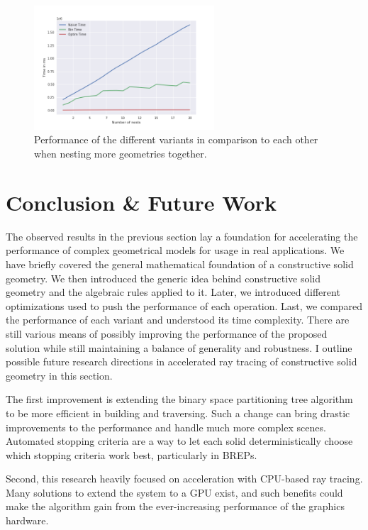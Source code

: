\documentclass[a4paper,11pt,oneside]{article}
\begin{document}
\begin{figure}[H]
	\centering
	\includegraphics[width=0.6\textwidth]{section5/plots/test_nesting.png}
	\caption{Performance of the different variants in comparison to each other when nesting more geometries together.}
	\label{sec5.2:test_nesting}
\end{figure}



\section{Conclusion \& Future Work}

The observed results in the previous section lay a foundation for accelerating the performance of complex geometrical models for usage in real applications. We have briefly covered the general mathematical foundation of a constructive solid geometry. We then introduced the generic idea behind constructive solid geometry and the algebraic rules applied to it. Later, we introduced different optimizations used to push the performance of each operation. Last, we compared the performance of each variant and understood its time complexity. There are still various means of possibly improving the performance of the proposed solution while still maintaining a balance of generality and robustness. I outline possible future research directions in accelerated ray tracing of constructive solid geometry in this section.

The first improvement is extending the binary space partitioning tree algorithm to be more efficient in building and traversing. Such a change can bring drastic improvements to the performance and handle much more complex scenes. Automated stopping criteria are a way to let each solid deterministically choose which stopping criteria work best, particularly in BREPs.

Second, this research heavily focused on acceleration with CPU-based ray tracing. Many solutions to extend the system to a GPU exist, and such benefits could make the algorithm gain from the ever-increasing performance of the graphics hardware.
\end{document}
